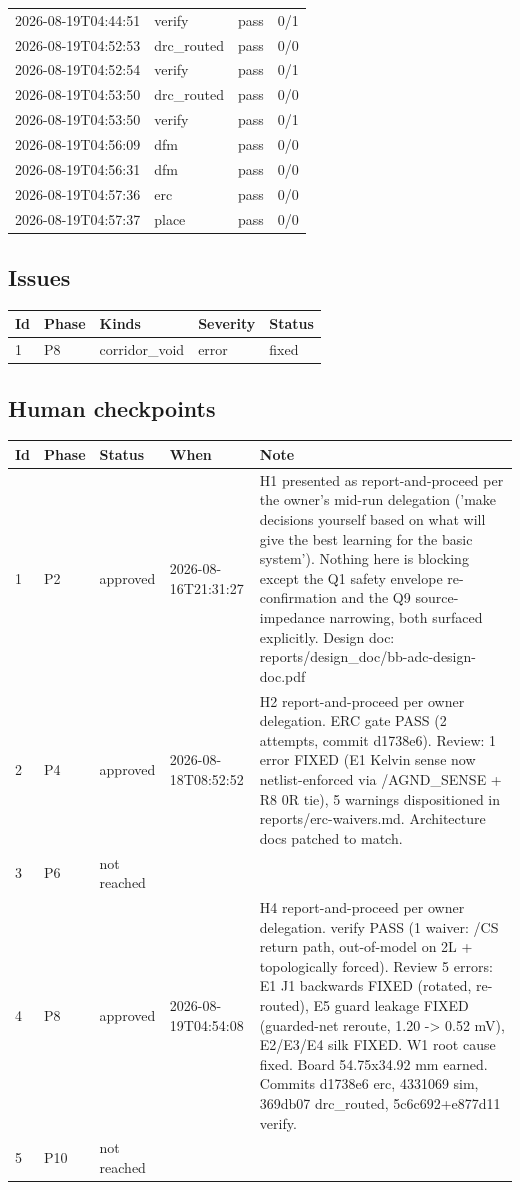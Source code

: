 \documentclass[11pt,a4paper]{article}
\begin{document}
{\begin{longtable}{llll}
2026-08-19T04:44:51 & verify & pass & 0/1 \\
2026-08-19T04:52:53 & drc\_routed & pass & 0/0 \\
2026-08-19T04:52:54 & verify & pass & 0/1 \\
2026-08-19T04:53:50 & drc\_routed & pass & 0/0 \\
2026-08-19T04:53:50 & verify & pass & 0/1 \\
2026-08-19T04:56:09 & dfm & pass & 0/0 \\
2026-08-19T04:56:31 & dfm & pass & 0/0 \\
2026-08-19T04:57:36 & erc & pass & 0/0 \\
2026-08-19T04:57:37 & place & pass & 0/0 \\
\bottomrule
\end{longtable}
}
\subsection*{Issues}
{\small
\begin{longtable}{llp{5cm}ll}
\toprule
\textbf{Id} & \textbf{Phase} & \textbf{Kinds} & \textbf{Severity} & \textbf{Status} \\
\midrule
\endhead
1 & P8 & corridor\_void & error & fixed \\
\bottomrule
\end{longtable}
}
\subsection*{Human checkpoints}
{\small
\begin{longtable}{lllp{2.6cm}p{6.4cm}}
\toprule
\textbf{Id} & \textbf{Phase} & \textbf{Status} & \textbf{When} & \textbf{Note} \\
\midrule
\endhead
1 & P2 & approved & 2026-08-16T21:31:27 & H1 presented as report-and-proceed per the owner's mid-run delegation ('make decisions yourself based on what will give the best learning for the basic system'). Nothing here is blocking except the Q1 safety envelope re-confirmation and the Q9 source-impedance narrowing, both surfaced explicitly. Design doc: reports/design\_doc/bb-adc-design-doc.pdf \\
2 & P4 & approved & 2026-08-18T08:52:52 & H2 report-and-proceed per owner delegation. ERC gate PASS (2 attempts, commit d1738e6). Review: 1 error FIXED (E1 Kelvin sense now netlist-enforced via /AGND\_SENSE + R8 0R tie), 5 warnings dispositioned in reports/erc-waivers.md. Architecture docs patched to match. \\
3 & P6 & not reached &  &  \\
4 & P8 & approved & 2026-08-19T04:54:08 & H4 report-and-proceed per owner delegation. verify PASS (1 waiver: /CS return path, out-of-model on 2L + topologically forced). Review 5 errors: E1 J1 backwards FIXED (rotated, re-routed), E5 guard leakage FIXED (guarded-net reroute, 1.20 -\textgreater{} 0.52 mV), E2/E3/E4 silk FIXED. W1 root cause fixed. Board 54.75x34.92 mm earned. Commits d1738e6 erc, 4331069 sim, 369db07 drc\_routed, 5c6c692+e877d11 verify. \\
5 & P10 & not reached &  &  \\
\bottomrule
\end{longtable}
}
\end{document}
